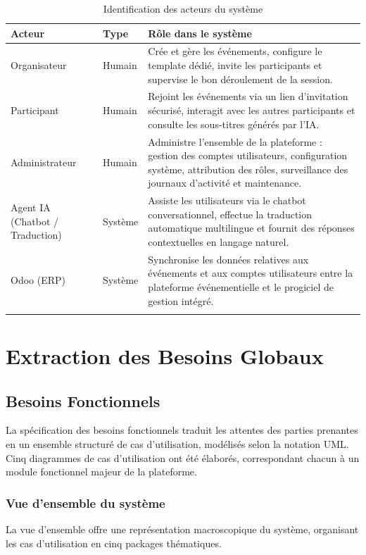 \begin{longtable}{|m{3.5cm}|m{2cm}|m{8cm}|}
\hline
\textbf{Acteur} & \textbf{Type} & \textbf{Rôle dans le système} \\
\hline
\endhead
\endfoot
\endlastfoot
\hline
Organisateur & Humain & Crée et gère les événements, configure le template dédié, invite les participants et supervise le bon déroulement de la session. \\
\hline
Participant & Humain & Rejoint les événements via un lien d'invitation sécurisé, interagit avec les autres participants et consulte les sous-titres générés par l'IA. \\
\hline
Administrateur & Humain & Administre l'ensemble de la plateforme : gestion des comptes utilisateurs, configuration système, attribution des rôles, surveillance des journaux d'activité et maintenance. \\
\hline
Agent IA (Chatbot / Traduction) & Système & Assiste les utilisateurs via le chatbot conversationnel, effectue la traduction automatique multilingue et fournit des réponses contextuelles en langage naturel. \\
\hline
Odoo (ERP) & Système & Synchronise les données relatives aux événements et aux comptes utilisateurs entre la plateforme événementielle et le progiciel de gestion intégré. \\
\hline
\captionsetup{justification=centering,margin=2cm}
\caption{Identification des acteurs du système}
\label{tab:acteurs}
\end{longtable}

\section{Extraction des Besoins Globaux}

\subsection{Besoins Fonctionnels}
La spécification des besoins fonctionnels traduit les attentes des parties prenantes en un ensemble structuré de cas d'utilisation, modélisés selon la notation UML. Cinq diagrammes de cas d'utilisation ont été élaborés, correspondant chacun à un module fonctionnel majeur de la plateforme.

\subsubsection{Vue d'ensemble du système}
La vue d'ensemble offre une représentation macroscopique du système, organisant les cas d'utilisation en cinq packages thématiques.

